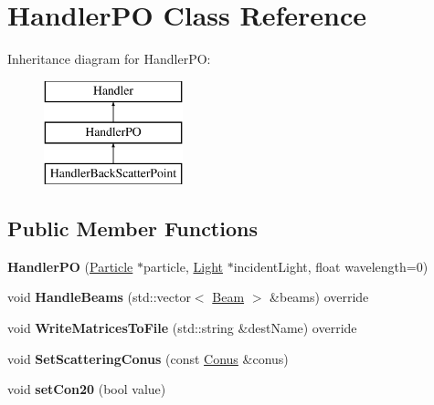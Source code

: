 \hypertarget{class_handler_p_o}{}\section{Handler\+PO Class Reference}
\label{class_handler_p_o}
Inheritance diagram for Handler\+PO\+:\begin{figure}[H]
\begin{center}
\leavevmode
\includegraphics[height=3.000000cm]{class_handler_p_o}
\end{center}
\end{figure}
\subsection*{Public Member Functions}
\begin{DoxyCompactItemize}
\item 
\mbox{\label{class_handler_p_o_ae4e146c9650b371deaeb6aa487e67928}} 
{\bfseries Handler\+PO} (\mbox{\hyperlink{class_particle}{Particle}} $\ast$particle, \mbox{\hyperlink{class_light}{Light}} $\ast$incident\+Light, float wavelength=0)
\item 
\mbox{\label{class_handler_p_o_a34614f0dab5f801ad4588fa5d1e0825d}} 
void {\bfseries Handle\+Beams} (std\+::vector$<$ \mbox{\hyperlink{class_beam}{Beam}} $>$ \&beams) override
\item 
\mbox{\label{class_handler_p_o_acd1699ce858357c838f4a2507013b4aa}} 
void {\bfseries Write\+Matrices\+To\+File} (std\+::string \&dest\+Name) override
\item 
\mbox{\label{class_handler_p_o_a0a25182f4636d39a85f00ff1c78dd833}} 
void {\bfseries Set\+Scattering\+Conus} (const \mbox{\hyperlink{struct_conus}{Conus}} \&conus)
\item 
\mbox{\label{class_handler_p_o_a5587518a68abb18ad556ec4f3521e397}} 
void {\bfseries set\+Con20} (bool value)
\end{DoxyCompactItemize}

